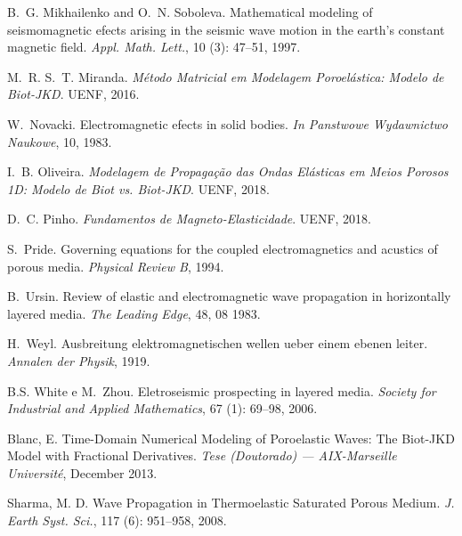 \documentclass[12pt,a4paper,oneside]{abntex2}
\begin{document}
\begin{thebibliography}{25}
B.~G. Mikhailenko and O.~N. Soboleva.
\newblock Mathematical modeling of seismomagnetic efects arising in the seismic
  wave motion in the earth's constant magnetic field.
\newblock \emph{Appl. Math. Lett.}, 10 (3): 47--51, 1997.

M.~R. S.~T. Miranda.
\newblock \emph{M\'etodo Matricial em Modelagem Poroel\'astica: Modelo de
  Biot-JKD}.
\newblock UENF, 2016.

W.~Novacki.
\newblock Electromagnetic efects in solid bodies.
\newblock \emph{In Panstwowe Wydawnictwo Naukowe}, 10, 1983.

I.~B. Oliveira.
\newblock \emph{Modelagem de Propaga\c{c}\~ao das Ondas El\'asticas em Meios
  Porosos 1D: Modelo de Biot vs. Biot-JKD}.
\newblock UENF, 2018.

D.~C. Pinho.
\newblock \emph{Fundamentos de Magneto-Elasticidade}.
\newblock UENF, 2018.

S.~Pride.
\newblock Governing equations for the coupled electromagnetics and acustics of
  porous media.
\newblock \emph{Physical Review B}, 1994.

B.~Ursin.
\newblock Review of elastic and electromagnetic wave propagation in
  horizontally layered media.
\newblock \emph{The Leading Edge}, 48, 08 1983.

H.~Weyl.
\newblock Ausbreitung elektromagnetischen wellen ueber einem ebenen leiter.
\newblock \emph{Annalen der Physik}, 1919.

B.S. White e M.~Zhou.
\newblock Eletroseismic prospecting in layered media.
\newblock \emph{Society for Industrial and Applied Mathematics}, 67
  (1): 69--98, 2006.

Blanc, E.
\newblock Time-Domain Numerical Modeling of Poroelastic Waves: The Biot-JKD
Model with Fractional Derivatives.
\newblock \emph{Tese (Doutorado) — AIX-Marseille Université}, December 2013.

Sharma, M. D.
\newblock Wave Propagation in Thermoelastic Saturated Porous Medium.
\newblock \emph{J. Earth Syst. Sci.}, 117
  (6): 951--958, 2008.

\end{thebibliography}
\end{document}
